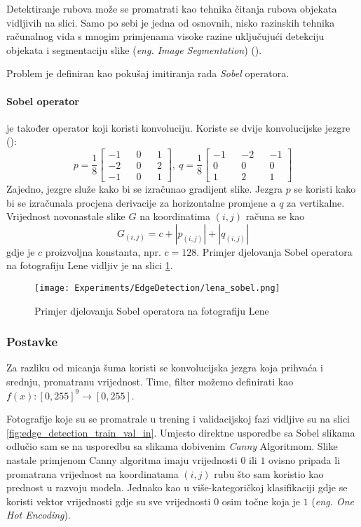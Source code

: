 Detektiranje rubova može se promatrati kao tehnika čitanja rubova objekata vidljivih na slici.
Samo po sebi je jedna od osnovnih, nisko razinskih tehnika računalnog vida s mnogim primjenama visoke razine uključujući detekciju objekata i segmentaciju slike (\emph{eng. Image Segmentation}) (\cite{Liu_2019}).

Problem je definiran kao pokušaj imitiranja rada \emph{Sobel} operatora.

 \paragraph{Sobel operator} je također operator koji koristi konvoluciju.
 Koriste se dvije konvolucijske jezgre (\cite{Sekanina2011}):
 \[
	 p = \frac{1}{8}
	 \begin{bmatrix}
		 -1 && 0 && 1 \\
		 -2 && 0 && 2 \\
		 -1 && 0 && 1
	 \end{bmatrix}
	 ,\ 
	 q = \frac{1}{8}
	 \begin{bmatrix}
		 -1 && -2 && -1 \\
		 0 && 0 && 0 \\
		 1 && 2 && 1
	 \end{bmatrix}
 \]
Zajedno, jezgre služe kako bi se izračunao gradijent slike.
Jezgra $p$ se koristi kako bi se izračunala procjena derivacije za horizontalne promjene a $q$ za vertikalne. \\
Vrijednost novonastale slike $G$ na koordinatima $(i, j)$ računa se kao
$$
G_{(i, j)} = c + |p_{(i, j)}| + |q_{(i, j)}|
$$
gdje je $c$ proizvoljna konstanta, npr. $c = 128$.
Primjer djelovanja Sobel operatora na fotografiju Lene vidljiv je na slici \ref{fig:lena_sobel}.

\begin{figure}
	\centering
	\texttt{[image: Experiments/EdgeDetection/lena\_sobel.png]}
	\caption{Primjer djelovanja Sobel operatora na fotografiju Lene}
	\label{fig:lena_sobel}
\end{figure}

\subsubsection{Postavke}
Za razliku od micanja šuma koristi se konvolucijska jezgra koja prihvaća i srednju, promatranu vrijednost.
Time, filter možemo definirati kao $f(x): [0, 255]^9 \rightarrow [0, 255]$.

Fotografije koje su se promatrale u trening i validacijskoj fazi vidljive su na slici \ref{fig:edge_detection_train_val_in}.
Umjesto direktne usporedbe sa Sobel slikama odlučio sam se na usporedbu sa slikama dobivenim \emph{Canny} Algoritmom.
Slike nastale primjenom Canny algoritma imaju vrijednosti $0$ ili $1$ ovisno pripada li promatrana vrijednost na koordinatama $(i, j)$ rubu što sam koristio kao prednost u razvoju modela.
Jednako kao u više-kategoričkoj klasifikaciji gdje se koristi vektor vrijednosti gdje su sve vrijednosti $0$ osim točne koja je $1$ (\emph{eng. One Hot Encoding}).

